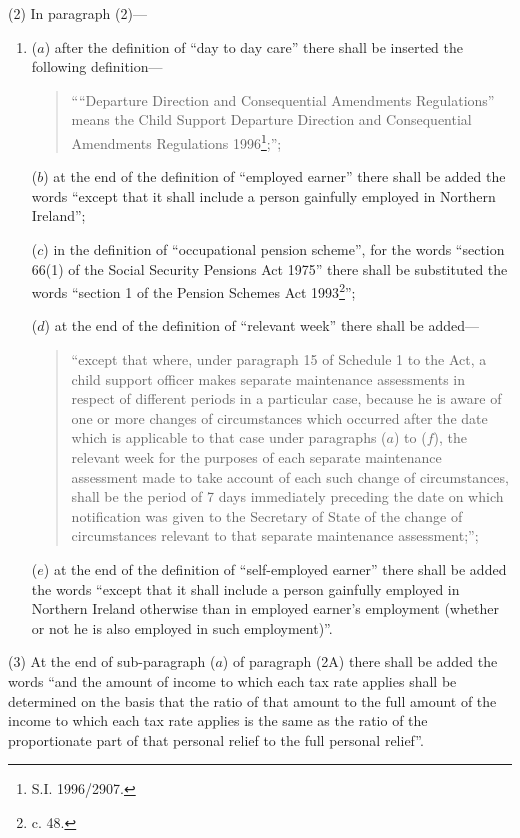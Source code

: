 \documentclass[12pt,a4paper]{article}
\begin{document}
(2) In paragraph (2)—
\begin{enumerate}\item[]
($a$) after the definition of “day to day care” there shall be inserted the following definition—
\begin{quotation}
““Departure Direction and Consequential Amendments Regulations” means the Child Support Departure Direction and Consequential Amendments Regulations 1996\footnote{\frenchspacing S.I. 1996/2907.};”;
\end{quotation}

($b$) at the end of the definition of “employed earner” there shall be added the words “except that it shall include a person gainfully employed in Northern Ireland”;

($c$) in the definition of “occupational pension scheme”, for the words “section 66(1) of the Social Security Pensions Act 1975” there shall be substituted the words “section 1 of the Pension Schemes Act 1993\footnote{ c. 48.}”;

($d$) at the end of the definition of “relevant week” there shall be added—
\begin{quotation}
“except that where, under paragraph 15 of Schedule 1 to the Act, a child support officer makes separate maintenance assessments in respect of different periods in a particular case, because he is aware of one or more changes of circumstances which occurred after the date which is applicable to that case under paragraphs ($a$) to ($f$), the relevant week for the purposes of each separate maintenance assessment made to take account of each such change of circumstances, shall be the period of 7 days immediately preceding the date on which notification was given to the Secretary of State of the change of circumstances relevant to that separate maintenance assessment;”;
\end{quotation}

($e$) at the end of the definition of “self-employed earner” there shall be added the words “except that it shall include a person gainfully employed in Northern Ireland otherwise than in employed earner’s employment (whether or not he is also employed in such employment)”.
\end{enumerate}

(3) At the end of sub-paragraph ($a$) of paragraph (2A) there shall be added the words “and the amount of income to which each tax rate applies shall be determined on the basis that the ratio of that amount to the full amount of the income to which each tax rate applies is the same as the ratio of the proportionate part of that personal relief to the full personal relief”.
\end{document}
